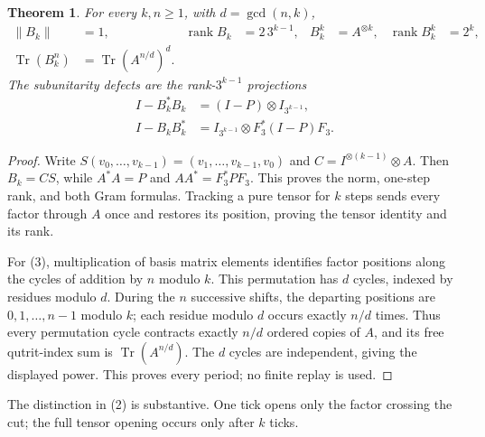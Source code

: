 \documentclass[10pt]{article}
\newtheorem{theorem}{Theorem}
\newcommand{\Tr}{\operatorname{Tr}}
\newcommand{\rank}{\operatorname{rank}}
\begin{document}
\begin{theorem}
For every $k,n\ge1$, with $d=\gcd(n,k)$,
\begin{align}
 \|B_k\|&=1,& \rank B_k&=2\,3^{k-1},
 &B_k^k&=A^{\otimes k},& \rank B_k^k&=2^k,             \tag{2}\\
 \Tr(B_k^n)&=\Tr(A^{n/d})^d.                           \tag{3}
\end{align}
The subunitarity defects are the rank-$3^{k-1}$ projections
\begin{align}
 I-B_k^*B_k&=(I-P)\otimes I_{3^{k-1}},\tag{4}\\
 I-B_kB_k^*&=I_{3^{k-1}}\otimes F_3^*(I-P)F_3.\tag{5}
\end{align}
\end{theorem}
\begin{proof}
Write $S(v_0,\ldots,v_{k-1})=(v_1,\ldots,v_{k-1},v_0)$ and
$C=I^{\otimes(k-1)}\otimes A$.  Then $B_k=CS$, while
$A^*A=P$ and $AA^*=F_3^*PF_3$.  This proves the norm, one-step rank, and
both Gram formulas.  Tracking a pure tensor for $k$ steps sends every factor
through $A$ once and restores its position, proving the tensor identity and
its rank.

For (3), multiplication of basis matrix elements identifies factor positions
along the cycles of addition by $n$ modulo $k$.  This permutation has $d$
cycles, indexed by residues modulo $d$.  During the $n$ successive shifts,
the departing positions are $0,1,\ldots,n-1$ modulo $k$; each residue modulo
$d$ occurs exactly $n/d$ times.  Thus every permutation cycle contracts
exactly $n/d$ ordered copies of $A$, and its free qutrit-index sum is
$\Tr(A^{n/d})$.  The $d$ cycles are independent, giving the displayed power.
This proves every period; no finite replay is used.
\end{proof}

The distinction in (2) is substantive.  One tick opens only the factor
crossing the cut; the full tensor opening occurs only after $k$ ticks.
\end{document}

